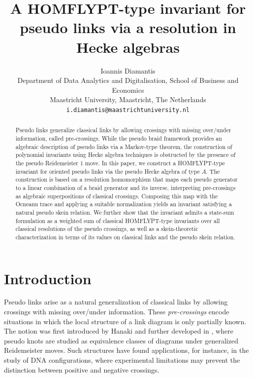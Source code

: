 \documentclass[11pt]{article}
\title{A HOMFLYPT-type invariant for pseudo links via a resolution in Hecke algebras}
\author{
Ioannis Diamantis\\
\small Department of Data Analytics and Digitalisation, School of Business and Economics\\
\small Maastricht University, Maastricht, The Netherlands\\
\small \texttt{i.diamantis@maastrichtuniversity.nl}
}
\date{}
\numberwithin{equation}{section}
\theoremstyle{definition}
\begin{document}
\maketitle

\begingroup
\renewcommand\thefootnote{}
\endgroup

\begin{abstract}
Pseudo links generalize classical links by allowing crossings with missing over/under information, called pre-crossings. While the pseudo braid framework provides an algebraic description of pseudo links via a Markov-type theorem, the construction of polynomial invariants using Hecke algebra techniques is obstructed by the presence of the pseudo Reidemeister 1 move. In this paper, we construct a HOMFLYPT-type invariant for oriented pseudo links via the pseudo Hecke algebra of type \(A\). The construction is based on a resolution homomorphism that maps each pseudo generator to a linear combination of a braid generator and its inverse, interpreting pre-crossings as algebraic superpositions of classical crossings. Composing this map with the Ocneanu trace and applying a suitable normalization yields an invariant satisfying a natural pseudo skein relation. We further show that the invariant admits a state-sum formulation as a weighted sum of classical HOMFLYPT-type invariants over all classical resolutions of the pseudo crossings, as well as a skein-theoretic characterization in terms of its values on classical links and the pseudo skein relation.
\end{abstract}



\section{Introduction}\label{intro}

Pseudo links arise as a natural generalization of classical links by allowing crossings with missing over/under information. These \emph{pre-crossings} encode situations in which the local structure of a link diagram is only partially known. The notion was first introduced by Hanaki \cite{Hanaki2010} and further developed in \cite{Henrich2013}, where pseudo knots are studied as equivalence classes of diagrams under generalized Reidemeister moves. Such structures have found applications, for instance, in the study of DNA configurations, where experimental limitations may prevent the distinction between positive and negative crossings.
\end{document}
